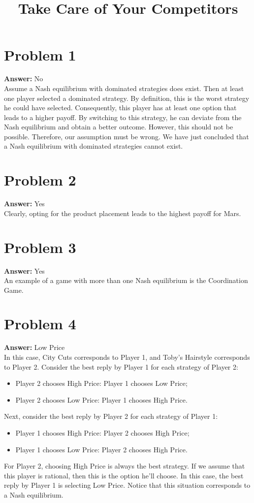 \documentclass[11pt]{article}
\date{}
\title{Take Care of Your Competitors}
\begin{document}
\thispagestyle{empty}
\pagestyle{empty}
\section*{Problem 1}
\label{sec:org6466e48}

\textbf{Answer:} No\\

Assume a Nash equilibrium with dominated strategies does exist. Then at least
one player selected a dominated strategy. By definition, this is the worst
strategy he could have selected. Consequently, this player has at least one
option that leads to a higher payoff. By switching to this strategy, he can
deviate from the Nash equilibrium and obtain a better outcome. However, this
should not be possible. Therefore, our assumption must be wrong. We have just
concluded that a Nash equilibrium with dominated strategies cannot exist.
\section*{Problem 2}
\label{sec:org3e4b0d4}

\textbf{Answer:} Yes\\

Clearly, opting for the product placement leads to the highest payoff for Mars.
\section*{Problem 3}
\label{sec:org5be0b16}

\textbf{Answer:} Yes\\

An example of a game with more than one Nash equilibrium is the Coordination
Game.
\section*{Problem 4}
\label{sec:org8f10b12}

\textbf{Answer:} Low Price\\

In this case, City Cuts corresponds to Player 1, and Toby's Hairstyle
corresponds to Player 2. Consider the best reply by Player 1 for each strategy
of Player 2:
\begin{itemize}
\item Player 2 chooses High Price: Player 1 chooses Low Price;
\item Player 2 chooses Low Price: Player 1 chooses High Price.
\end{itemize}
Next, consider the best reply by Player 2 for each strategy of Player 1:
\begin{itemize}
\item Player 1 chooses High Price: Player 2 chooses High Price;
\item Player 1 chooses Low Price: Player 2 chooses High Price.
\end{itemize}
For Player 2, choosing High Price is always the best strategy. If we assume that
this player is rational, then this is the option he'll choose. In this case, the
best reply by Player 1 is selecting Low Price. Notice that this situation
corresponds to a Nash equilibrium.
\end{document}
